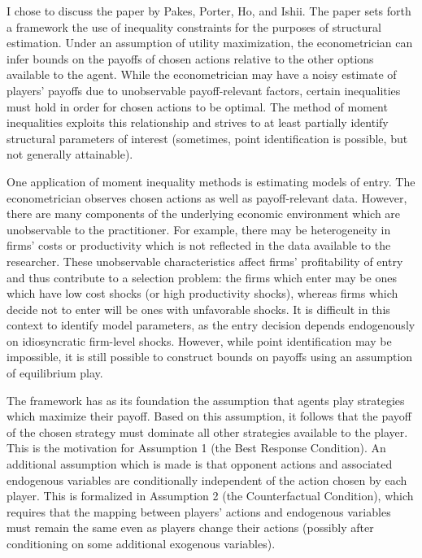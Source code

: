 \documentclass[12pt]{article}
\begin{document}
I chose to discuss the paper by Pakes, Porter, Ho, and Ishii. The paper sets forth a framework the use of inequality constraints for the purposes of structural estimation. Under an assumption of utility maximization, the econometrician can infer bounds on the payoffs of chosen actions relative to the other options available to the agent. While the econometrician may have a noisy estimate of players' payoffs due to unobservable payoff-relevant factors, certain inequalities must hold in order for chosen actions to be optimal. The method of moment inequalities exploits this relationship and strives to at least partially identify structural parameters of interest (sometimes, point identification is possible, but not generally attainable).

One application of moment inequality methods is estimating models of entry. The econometrician observes chosen actions as well as payoff-relevant data. However, there are many components of the underlying economic environment which are unobservable to the practitioner. For example, there may be heterogeneity in firms' costs or productivity which is not reflected in the data available to the researcher. These unobservable characteristics affect firms' profitability of entry and thus contribute to a selection problem: the firms which enter may be ones which have low cost shocks (or high productivity shocks), whereas firms which decide not to enter will be ones with unfavorable shocks. It is difficult in this context to identify model parameters, as the entry decision depends endogenously on idiosyncratic firm-level shocks. However, while point identification may be impossible, it is still possible to construct bounds on payoffs using an assumption of equilibrium play. 

The framework has as its foundation the assumption that agents play strategies which maximize their payoff. Based on this assumption, it follows that the payoff of the chosen strategy must dominate all other strategies available to the player. This is the motivation for Assumption 1 (the Best Response Condition). An additional assumption which is made is that opponent actions and associated endogenous variables are conditionally independent of the action chosen by each player. This is formalized in Assumption 2 (the Counterfactual Condition), which requires that the mapping between players' actions and endogenous variables must remain the same even as players change their actions (possibly after conditioning on some additional exogenous variables).
\end{document}
